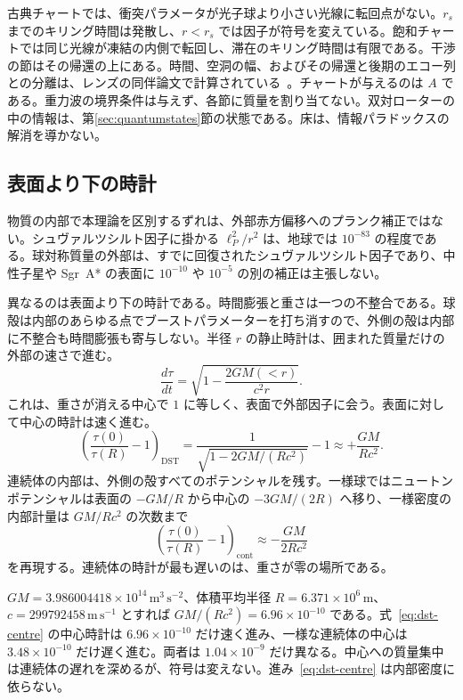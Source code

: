 \documentclass[a4paper]{article}
\begin{document}
古典チャートでは、衝突パラメータが光子球より小さい光線に転回点がない。\(r_s\) までのキリング時間は発散し、\(r<r_s\) では因子が符号を変えている。飽和チャートでは同じ光線が凍結の内側で転回し、滞在のキリング時間は有限である。干渉の節はその帰還の上にある。時間、空洞の幅、およびその帰還と後期のエコー列との分離は、レンズの同伴論文で計算されている~\cite{dst-lensing}。チャートが与えるのは \(A\) である。重力波の境界条件は与えず、各節に質量を割り当てない。双対ローターの中の情報は、第\ref{sec:quantumstates}節の状態である。床は、情報パラドックスの解消を導かない。

\subsection{表面より下の時計}
\label{subsec:interior-clock}

物質の内部で本理論を区別するずれは、外部赤方偏移へのプランク補正ではない。シュヴァルツシルト因子に掛かる \(\ell_P^{2}/r^{2}\) は、地球では \(10^{-83}\) の程度である。球対称質量の外部は、すでに回復されたシュヴァルツシルト因子であり、中性子星や Sgr~A* の表面に \(10^{-10}\) や \(10^{-5}\) の別の補正は主張しない。

異なるのは表面より下の時計である。時間膨張と重さは一つの不整合である。球殻は内部のあらゆる点でブーストパラメーターを打ち消すので、外側の殻は内部に不整合も時間膨張も寄与しない。半径 \(r\) の静止時計は、囲まれた質量だけの外部の速さで進む。
\begin{equation}
\label{eq:interior-clock}
\frac{d\tau}{dt}
=\sqrt{1-\frac{2GM(<r)}{c^{2}r}}.
\end{equation}
これは、重さが消える中心で \(1\) に等しく、表面で外部因子に会う。表面に対して中心の時計は速く進む。
\begin{equation}
\label{eq:dst-centre}
\left(\frac{\tau(0)}{\tau(R)}-1\right)_{\mathrm{DST}}
=\frac{1}{\sqrt{1-2GM/(Rc^{2})}}-1
\approx +\frac{GM}{Rc^{2}}.
\end{equation}
連続体の内部は、外側の殻すべてのポテンシャルを残す。一様球ではニュートンポテンシャルは表面の \(-GM/R\) から中心の \(-3GM/(2R)\) へ移り、一様密度の内部計量は \(GM/Rc^{2}\) の次数まで
\begin{equation}
\label{eq:continuum-centre}
\left(\frac{\tau(0)}{\tau(R)}-1\right)_{\mathrm{cont}}
\approx -\frac{GM}{2Rc^{2}}
\end{equation}
を再現する。連続体の時計が最も遅いのは、重さが零の場所である。

\(GM=3.986004418\times 10^{14}\,\mathrm{m^{3}\,s^{-2}}\)、体積平均半径 \(R=6.371\times 10^{6}\,\mathrm{m}\)、\(c=299792458\,\mathrm{m\,s^{-1}}\) とすれば \(GM/(Rc^{2})=6.96\times 10^{-10}\) である。式~\eqref{eq:dst-centre} の中心時計は \(6.96\times 10^{-10}\) だけ速く進み、一様な連続体の中心は \(3.48\times 10^{-10}\) だけ遅く進む。両者は \(1.04\times 10^{-9}\) だけ異なる。中心への質量集中は連続体の遅れを深めるが、符号は変えない。進み~\eqref{eq:dst-centre} は内部密度に依らない。
\end{document}
